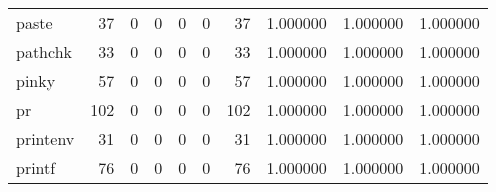\begin{longtable}{lrrrrrrrrr}
paste     &                                        37 &                                                  0 &                                                  0 &                                                  0 &                                                  0 &                                                 37 &                                           1.000000 &                               1.000000 &                             1.000000 \\
pathchk   &                                        33 &                                                  0 &                                                  0 &                                                  0 &                                                  0 &                                                 33 &                                           1.000000 &                               1.000000 &                             1.000000 \\
pinky     &                                        57 &                                                  0 &                                                  0 &                                                  0 &                                                  0 &                                                 57 &                                           1.000000 &                               1.000000 &                             1.000000 \\
pr        &                                       102 &                                                  0 &                                                  0 &                                                  0 &                                                  0 &                                                102 &                                           1.000000 &                               1.000000 &                             1.000000 \\
printenv  &                                        31 &                                                  0 &                                                  0 &                                                  0 &                                                  0 &                                                 31 &                                           1.000000 &                               1.000000 &                             1.000000 \\
printf    &                                        76 &                                                  0 &                                                  0 &                                                  0 &                                                  0 &                                                 76 &                                           1.000000 &                               1.000000 &                             1.000000 \\

\end{longtable}
